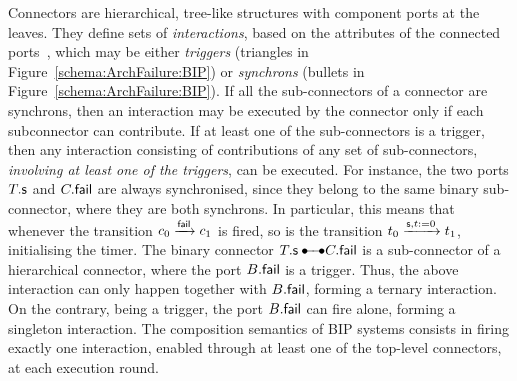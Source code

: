 \documentclass[smallcondensed]{svjour3}
\newcommand{\mdash}{---}
\newcommand{\goesto}[2][]{\ensuremath{\xrightarrow[#1]{#2}}}
\begin{document}
Connectors are hierarchical, tree-like structures with component ports
at the leaves.  They define sets of \emph{interactions}, based on the
attributes of the connected ports~\cite{BliSif08-acp-tc}, which may be
either \emph{triggers} (triangles in Figure~\ref{schema:ArchFailure:BIP})
or \emph{synchrons} (bullets in Figure~\ref{schema:ArchFailure:BIP}).
%
If all the sub-connectors of a connector are synchrons, then an
interaction may be executed by the connector only if each subconnector
can contribute.
%
If at least one of the sub-connectors is a trigger, then any
interaction consisting of contributions of any set of sub-connectors,
\emph{involving at least one of the triggers}, can be executed.
%
For instance, the two ports $T.\mathsf{s}$ and
$C.\mathsf{fail}$ are always synchronised, since they belong to
the same binary sub-connector, where they are both synchrons.  In
particular, this means that whenever the transition 
$c_0 \goesto{\PortFail} c_1$ is fired, so is the transition
$t_0 \goesto{\PortStart, t:=0} t_1$,
initialising the timer.  The binary connector $\NameTimer.\PortStart
\bullet\!\!\!-\!\!\!-\!\!\!\bullet \NameCtrl.\PortFail$ is a
sub-connector of a hierarchical connector, where the port
$B.\mathsf{fail}$ is a trigger.  Thus, the above interaction can
only happen together with $B.\mathsf{fail}$, forming a
ternary interaction.  On the contrary, being a trigger, the port
$B.\mathsf{fail}$ can fire alone, forming a singleton
interaction.  The composition semantics of BIP systems consists in
firing exactly one interaction, enabled through at least one of the
top-level connectors, at each execution round.


%
\end{document}
